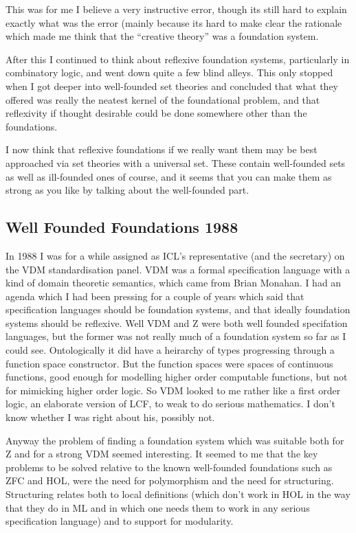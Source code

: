 \documentclass{rbjk}
\begin{document}
\begin{article}
This was for me I believe a very instructive error, though its still hard to explain exactly what was the error (mainly because its hard to make clear the rationale which made me think that the ``creative theory'' was a foundation system.

After this I continued to think about reflexive foundation systems, particularly in combinatory logic, and went down quite a few blind alleys.
This only stopped when I got deeper into well-founded set theories and concluded that what they offered was really the neatest kernel of the foundational problem, and that reflexivity if thought desirable could be done somewhere other than the foundations.

I now think that reflexive foundations if we really want them may be best approached via set theories with a universal set.
These contain well-founded sets as well as ill-founded ones of course, and it seems that you can make them as strong as you like by talking about the well-founded part.

\subsection{Well Founded Foundations 1988}

In 1988 I was for a while assigned as ICL's representative (and the secretary) on the VDM standardisation panel.
VDM was a formal specification language with a kind of domain theoretic semantics, which came from Brian Monahan.
I had an agenda which I had been pressing for a couple of years which said that specification languages should be foundation systems, and that ideally foundation systems should be reflexive.
Well VDM and Z were both well founded specifation languages, but the former was not really much of a foundation system so far as I could see.
Ontologically it did have a heirarchy of types progressing through a function space constructor.
But the function spaces were spaces of continuous functions, good enough for modelling higher order computable functions, but not for mimicking higher order logic.
So VDM looked to me rather like a first order logic, an elaborate version of LCF, to weak to do serious mathematics.
I don't know whether I was right about his, possibly not.

Anyway the problem of finding a foundation system which was suitable both for Z and for a strong VDM seemed interesting.
It seemed to me that the key problems to be solved relative to the known well-founded foundations such as ZFC and HOL, were the need for polymorphism and the need for structuring.
Structuring relates both to local definitions (which don't work in HOL in the way that they do in ML and in which one needs them to work in any serious specification language) and to support for modularity.


\end{article}
\end{document}
